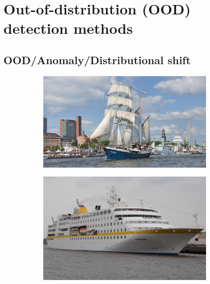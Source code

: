     
    
    \section{Out-of-distribution (OOD) detection methods}

    \subsection{OOD/Anomaly/Distributional shift}
\label{sec:oodvanom}
\begin{figure}[h!]
    \begin{subfigure}{0.333\textwidth}
        \centering
        \includegraphics[height=0.15\textheight,width=0.95\textwidth]{images/intro_ood_anomaly/old_ship.jpg}
        \caption{}
        \label{fig:old_ship}
    \end{subfigure}
    \begin{subfigure}{0.333\textwidth}
        \centering
        \includegraphics[height=0.15\textheight,width=0.95\textwidth]{images/intro_ood_anomaly/Trainer_cruiser.jpeg}
        \caption{}

\end{subfigure}
\end{figure}
